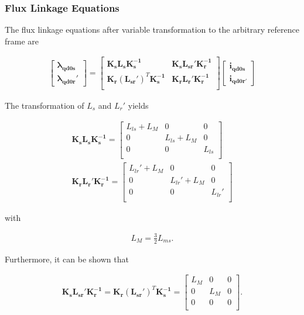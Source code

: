 \begin{flushleft}
\subsubsection{Flux Linkage Equations}
The flux linkage equations after variable transformation to the arbitrary reference frame are

\begin{align*}
\begin{bmatrix}
\mathbf{\lambda_{qd0s}} \\
\mathbf{\lambda_{qd0r}'}
\end{bmatrix}
=
\begin{bmatrix}
\mathbf{K_s}\mathbf{L_s}\mathbf{K_s^{-1}} & \mathbf{K_s}\mathbf{L_{sr}'}\mathbf{K_r^{-1}} \\
\mathbf{K_r}(\mathbf{L_{sr}'})^T\mathbf{K_s^{-1}} & \mathbf{K_r}\mathbf{L_r'}\mathbf{K_r^{-1}} \\
\end{bmatrix}
\begin{bmatrix}
\mathbf{i_{qd0s}} \\
\mathbf{i_{qd0r'}}
\end{bmatrix}
\end{align*}

The transformation of $L_{s}$ and $L_{r}'$ yields

\begin{align*}
\mathbf{K_s}\mathbf{L_s}\mathbf{K_s^{-1}} =
\begin{bmatrix}
L_{ls} + L_{M} & 0 & 0 \\
0 & L_{ls} + L_{M} & 0 \\
0 & 0 & L_{ls} \\
\end{bmatrix} \\
\mathbf{K_r}\mathbf{L_r'}\mathbf{K_r^{-1}} =
\begin{bmatrix}
L_{lr}' + L_{M} & 0 & 0 \\
0 & L_{lr}' + L_{M} & 0 \\
0 & 0 & L_{lr}' \\
\end{bmatrix}
\end{align*}

with

\begin{align*}
L_{M} = \frac{3}{2}L_{ms}.
\end{align*}

Furthermore, it can be shown that

\begin{align*}
\mathbf{K_s}\mathbf{L_{sr}'}\mathbf{K_r^{-1}} = \mathbf{K_r}(\mathbf{L_{sr}'})^T\mathbf{K_s^{-1}} =
\begin{bmatrix}
L_{M} & 0 & 0 \\
0 & L_{M} & 0 \\
0 & 0 & 0 \\
\end{bmatrix}.
\end{align*}


\end{flushleft}
